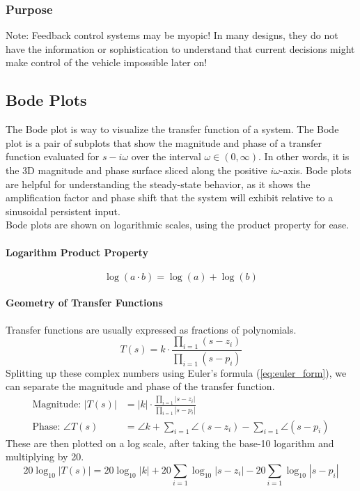 \documentclass[../notes.tex]{subfiles}
\begin{document}
\subsubsection{Purpose}
\begin{emphasis} \label{sec:feedbackMyopia}
   $\boxed{\text{Note:}}$ Feedback control systems may be myopic! In many designs, they do not have the information or sophistication to understand that current decisions might make control of the vehicle impossible later on!
\end{emphasis}

\subsection{Bode Plots}
The Bode plot is way to visualize the transfer function of a system. The Bode plot is a pair of subplots that show the magnitude and phase of a transfer function evaluated for $s-i\omega$ over the interval $\omega \in (0, \infty)$. In other words, it is the 3D magnitude and phase surface sliced along the positive $i\omega$-axis. Bode plots are helpful for understanding the steady-state behavior, as it shows the amplification factor and phase shift that the system will exhibit relative to a sinusoidal persistent input.\\ 
Bode plots are shown on logarithmic scales, using the product property for ease.
\paragraph{Logarithm Product Property}
\begin{equation*}
    \log(a\cdot b) = \log(a) + \log(b)
\end{equation*}

\paragraph{Geometry of Transfer Functions}
Transfer functions  are usually expressed as fractions of polynomials.
\begin{equation*}
    T(s) = k \cdot \frac{\prod_{i=1}(s-z_i)}{\prod_{i=1}(s-p_i)}
\end{equation*}
Splitting up these complex numbers using Euler's formula (\underline{\ref{eq:euler_form}}), we can separate the magnitude and phase of the transfer function.
\begin{align*}
    \text{Magnitude: } |T(s)| &= |k| \cdot \frac{\prod_{i=1}|s-z_i|}{\prod_{i=1}|s-p_i|} \\
    \text{Phase: } \angle T(s) &= \angle k + \sum_{i=1} \angle(s-z_i) - \sum_{i=1} \angle(s-p_i)
\end{align*}
These are then plotted on a log scale, after taking the base-10 logarithm and multiplying by 20.
\begin{equation*}
    20\log_{10}|T(s)| = 20\log_{10}|k| + 20\sum_{i=1}\log_{10}|s-z_i| - 20\sum_{i=1}\log_{10}|s-p_i|
\end{equation*}
\end{document}
